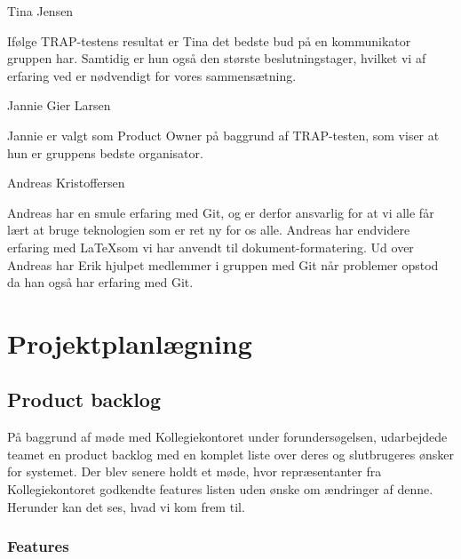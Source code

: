 \documentclass[12pt, a4paper]{report}
\begin{document}
 Tina Jensen

Ifølge TRAP-testens resultat er Tina det bedste bud på en kommunikator gruppen har. Samtidig er hun også den største beslutningstager, hvilket vi af erfaring ved er nødvendigt for vores sammensætning.

 Jannie Gier Larsen

Jannie er valgt som Product Owner på baggrund af TRAP-testen, som viser at hun er gruppens bedste organisator.

 Andreas Kristoffersen

Andreas har en smule erfaring med Git, og er derfor ansvarlig for at vi alle får lært at bruge teknologien som er ret ny for os alle. Andreas har endvidere erfaring med \LaTeX som vi har anvendt til dokument-formatering. Ud over Andreas har Erik hjulpet medlemmer i gruppen med Git når problemer opstod da han også har erfaring med Git.

\section{Projektplanlægning}

\subsection{Product backlog}

På baggrund af møde med Kollegiekontoret under forundersøgelsen, udarbejdede teamet en product backlog med en komplet liste over deres og slutbrugeres ønsker for systemet. Der blev senere holdt et møde, hvor repræsentanter fra Kollegiekontoret godkendte features listen uden ønske om ændringer af denne. Herunder kan det ses, hvad vi kom frem til.

\subsubsection{Features}
\end{document}
